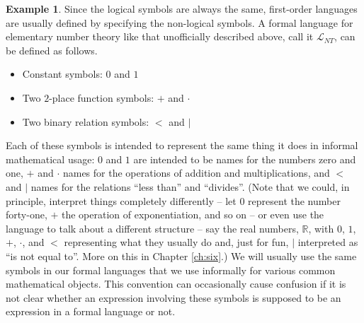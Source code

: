 \documentclass[12pt]{amsbook}
\theoremstyle{plain}
\theoremstyle{definition}
\newtheorem{exmp}{Example}[chapter]
\theoremstyle{remark}
\begin{document}
\begin{exmp} \label{e:lannt}
Since the logical symbols are always the same,  first-order languages are usually defined by specifying the non-logical symbols.  A formal language for elementary number theory like that unofficially described above,  call it $\mathcal{L}_{NT}$,  can be defined as follows. 
\begin{itemize}
\item Constant symbols:  $0$ and $1$
\item Two $2$-place function symbols:  $+$ and $\cdot$
\item Two binary relation symbols:  $<$ and $|$
\end{itemize}
Each of these symbols is intended to represent the same thing it does in informal mathematical usage:  $0$ and $1$ are intended to be names for the numbers zero and one,  $+$ and $\cdot$ names for the operations of addition and multiplications,  and $<$ and $|$ names for the relations ``less than'' and ``divides''.  (Note that we could,  in principle,  interpret things completely differently -- let $0$ represent the number forty-one,  $+$ the operation of exponentiation,  and so on -- or even use the language to talk about a different structure -- say the real numbers,  $\mathbb{R}$,  with $0$,  $1$,  $+$,  $\cdot$,  and $<$ representing what they usually do and,  just for fun,  $|$ interpreted as ``is not equal to''.  More on this in Chapter \ref{ch:six}.)  We will usually use the same symbols in our formal languages that we use informally for various common mathematical objects.  This convention can occasionally cause confusion if it is not clear whether an expression involving these symbols is supposed to be an expression in a formal language or not.  
\end{exmp}
\end{document}
